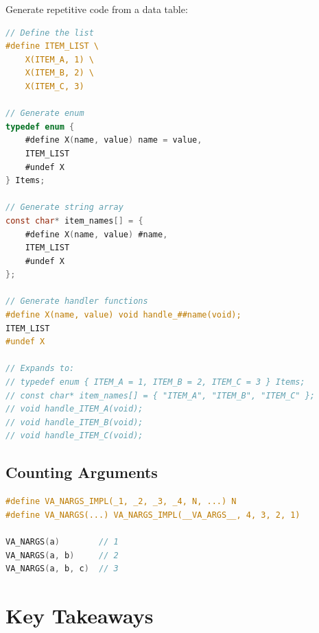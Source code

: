Generate repetitive code from a data table:

\begin{lstlisting}[language=C]
// Define the list
#define ITEM_LIST \
    X(ITEM_A, 1) \
    X(ITEM_B, 2) \
    X(ITEM_C, 3)

// Generate enum
typedef enum {
    #define X(name, value) name = value,
    ITEM_LIST
    #undef X
} Items;

// Generate string array
const char* item_names[] = {
    #define X(name, value) #name,
    ITEM_LIST
    #undef X
};

// Generate handler functions
#define X(name, value) void handle_##name(void);
ITEM_LIST
#undef X

// Expands to:
// typedef enum { ITEM_A = 1, ITEM_B = 2, ITEM_C = 3 } Items;
// const char* item_names[] = { "ITEM_A", "ITEM_B", "ITEM_C" };
// void handle_ITEM_A(void);
// void handle_ITEM_B(void);
// void handle_ITEM_C(void);
\end{lstlisting}

\subsection{Counting Arguments}

\begin{lstlisting}[language=C]
#define VA_NARGS_IMPL(_1, _2, _3, _4, N, ...) N
#define VA_NARGS(...) VA_NARGS_IMPL(__VA_ARGS__, 4, 3, 2, 1)

VA_NARGS(a)        // 1
VA_NARGS(a, b)     // 2
VA_NARGS(a, b, c)  // 3
\end{lstlisting}

\section{Key Takeaways}

